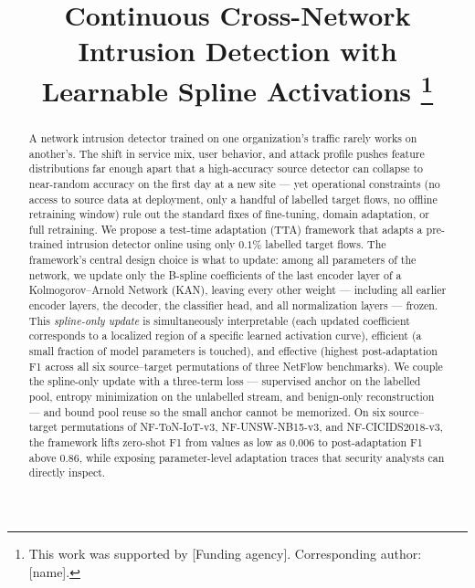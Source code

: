 \documentclass[10pt, conference, letterpaper]{IEEEtran}
\begin{document}
\title{Continuous Cross-Network Intrusion Detection with\\
Learnable Spline Activations
\thanks{This work was supported by [Funding agency]. Corresponding author: [name].}
}

\author{
}

\maketitle

\begin{abstract}
A network intrusion detector trained on one organization's traffic rarely works on another's. The shift in service mix, user behavior, and attack profile pushes feature distributions far enough apart that a high-accuracy source detector can collapse to near-random accuracy on the first day at a new site --- yet operational constraints (no access to source data at deployment, only a handful of labelled target flows, no offline retraining window) rule out the standard fixes of fine-tuning, domain adaptation, or full retraining. We propose a test-time adaptation (TTA) framework that adapts a pre-trained intrusion detector online using only $0.1\%$ labelled target flows. The framework's central design choice is what to update: among all parameters of the network, we update only the B-spline coefficients of the last encoder layer of a Kolmogorov--Arnold Network (KAN), leaving every other weight --- including all earlier encoder layers, the decoder, the classifier head, and all normalization layers --- frozen. This \emph{spline-only update} is simultaneously interpretable (each updated coefficient corresponds to a localized region of a specific learned activation curve), efficient (a small fraction of model parameters is touched), and effective (highest post-adaptation F1 across all six source--target permutations of three NetFlow benchmarks). We couple the spline-only update with a three-term loss --- supervised anchor on the labelled pool, entropy minimization on the unlabelled stream, and benign-only reconstruction --- and bound pool reuse so the small anchor cannot be memorized. On six source--target permutations of NF-ToN-IoT-v3, NF-UNSW-NB15-v3, and NF-CICIDS2018-v3, the framework lifts zero-shot F1 from values as low as $0.006$ to post-adaptation F1 above $0.86$, while exposing parameter-level adaptation traces that security analysts can directly inspect.
\end{abstract}
\end{document}
